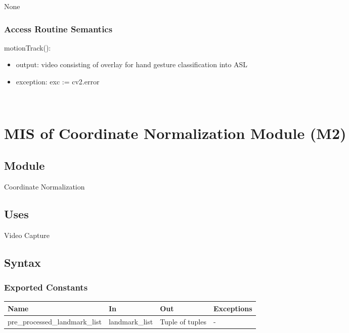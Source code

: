 \documentclass[12pt, titlepage]{article}
\begin{document}
None

\subsubsection{Access Routine Semantics}

\noindent motionTrack():
\begin{itemize}
\item output: video consisting of overlay for hand gesture classification into ASL\\
\item exception: exc := cv2.error\\
\end{itemize}

\newpage
~\newpage

\section{MIS of Coordinate Normalization Module (M2)} \label{M2}

\subsection{Module}

Coordinate Normalization\\

\subsection{Uses}

Video Capture\\

\subsection{Syntax}

\subsubsection{Exported Constants}

\begin{center}
\begin{tabular}{p{2cm} p{4cm} p{4cm} p{2cm}}
\hline
\textbf{Name} & \textbf{In} & \textbf{Out} & \textbf{Exceptions} \\
\hline
pre_processed_landmark_list & landmark_list & Tuple of tuples & - \\
\hline
\end{tabular}
\end{center}
\end{document}
